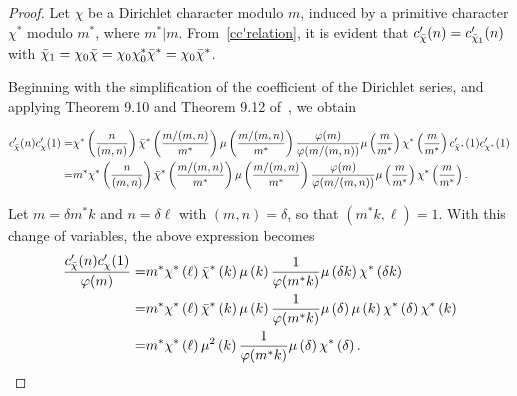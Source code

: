 \documentclass[12pt, oneside,reqno]{amsart}
\numberwithin{equation}{section}
\begin{document}
\begin{proof}
Let $\chi$ be a Dirichlet character modulo $m$, induced by a primitive character $\chi^{*}$ modulo $m^{*}$, where $m^{*}|m$. From~\eqref{cc'relation}, it is evident that $c'_{\Bar{\chi}}(n)=c'_{\Bar{\chi}_1}(n)$ with $\bar{\chi}_1=\chi_0\bar{\chi}=\chi_0\chi^*_0\bar{\chi}^*=\chi_0\Bar{\chi}^*$.

\medskip

Beginning with the simplification of the coefficient of the Dirichlet series, and applying Theorem 9.10 and Theorem 9.12 of~\cite{montgomeryvaughanbook}, we obtain

\begin{align*}
c'_{\Bar{\chi}}(n)c'_{{\chi}}(1)
=&\chi^{*}\left(\frac{n}{(m,n)}\right)\bar{\chi}^{*}\left(\frac{m/(m,n)}{m^{*}}\right)\mu\left(\frac{m/(m,n)}{m^{*}}\right)\frac{\varphi(m)}{\varphi(m/(m,n))}\mu\left(\frac{m}{m^{*}}\right)\chi^{*}\left(\frac{m}{m^{*}}\right)c'_{\bar{\chi}^{*}}(1)c'_{{\chi^{*}}}(1)\\
=&m^{*}\chi^{*}\left(\frac{n}{(m,n)}\right)\bar{\chi}^{*}\left(\frac{m/(m,n)}{m^{*}}\right)\mu\left(\frac{m/(m,n)}{m^{*}}\right)\frac{\varphi(m)}{\varphi(m/(m,n))}\mu\left(\frac{m}{m^{*}}\right)\chi^{*}\left(\frac{m}{m^{*}}\right).
\end{align*}

\noindent
Let $m=\delta m^*k$ and $n=\delta\ell$ with $(m,n)=\delta$, so that $(m^*k,\ell)=1$. With this change of variables, the above expression becomes
\begin{align}\label{simplifiedcoefficient}
\frac{c'_{\Bar{\chi}}(n)c'_{{\chi}}(1)}{\varphi(m)}
=&m^{*}\chi^{*}\left(\ell\right)\bar{\chi}^{*}\left(k\right)\mu\left(k\right)\frac{1}{\varphi(m^*k)}\mu\left(\delta k\right)\chi^{*}\left(\delta k\right)\nonumber\\
=&m^{*}\chi^{*}\left(\ell\right)\bar{\chi}^{*}\left(k\right)\mu\left(k\right)\frac{1}{\varphi(m^*k)}\mu\left(\delta\right)\mu\left( k\right)\chi^{*}\left(\delta\right)\chi^{*}\left(k\right)\nonumber\\
=&m^{*}\chi^{*}\left(\ell\right)\mu^2\left(k\right)\frac{1}{\varphi(m^*k)}\mu\left(\delta\right)\chi^{*}\left(\delta\right).
\end{align}


\end{proof}
\end{document}
